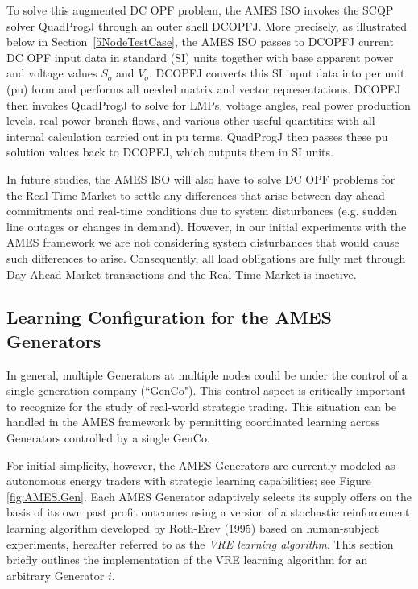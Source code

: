 \documentclass[12pt]{article}
\begin{document}
To solve this augmented DC OPF problem, the AMES ISO invokes the SCQP solver QuadProgJ through an outer shell DCOPFJ.  More precisely, as illustrated below in Section~\ref{5NodeTestCase}, the AMES ISO passes to DCOPFJ current DC OPF input data in standard (SI) units together with base apparent power and voltage values $S_o$ and $V_o$.  DCOPFJ converts this SI input data into per unit (pu) form and performs all needed matrix and vector representations.  DCOPFJ then invokes QuadProgJ to solve for LMPs, voltage angles, real power production levels, real power branch flows, and various other useful quantities  with all internal calculation carried out in pu terms.  QuadProgJ then passes these pu solution values back to DCOPFJ, which outputs them in SI units.  

In future studies, the AMES ISO will also have to solve DC OPF problems for the Real-Time Market to settle any differences that arise between day-ahead commitments and real-time conditions due to system disturbances (e.g. sudden line outages or changes in demand).  However, in our initial experiments with the AMES framework we are not considering system disturbances that would cause such differences to arise.  Consequently, all load obligations are fully met through Day-Ahead Market transactions and the Real-Time Market is inactive. 



\subsection{Learning Configuration for the AMES Generators \label{TraderLearning} }    

In general, multiple Generators at multiple nodes could be under the control of a single 
generation company (``GenCo").  This control aspect is critically important to recognize for 
the study of real-world strategic trading.  This situation can be handled in the AMES framework 
by permitting coordinated learning across Generators controlled by a single GenCo.  

For initial simplicity, however, the AMES Generators are currently modeled as autonomous energy traders 
with strategic learning capabilities; see Figure \ref{fig:AMES.Gen}. Each AMES Generator adaptively selects its supply offers on the basis of its own past profit outcomes using a version of a stochastic reinforcement learning algorithm developed by Roth-Erev (1995) based on human-subject experiments, hereafter referred to as the \textit{VRE learning algorithm\/}.  This section briefly outlines the implementation of the VRE learning algorithm for an arbitrary 
Generator $i$.  
\end{document}
